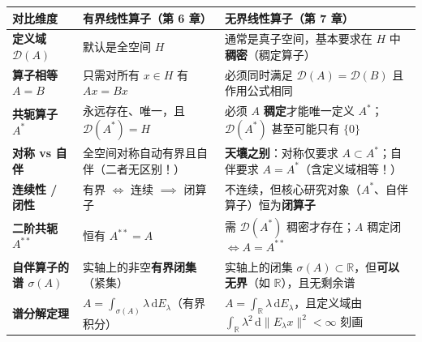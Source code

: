 \documentclass[11pt,a4paper]{article}
\newcounter{none}
\begin{document}
{\def\LTcaptype{none} %
{\small\renewcommand{\arraystretch}{1.38}\setlength{\tabcolsep}{5pt}
\begin{longtable}[]{@{}
  >{\raggedright\arraybackslash}p{}
  >{\raggedright\arraybackslash}p{}
  >{\raggedright\arraybackslash}p{}@{}}
\toprule\noalign{}
\rowcolor{AccentSoft}
\begin{minipage}[b]{\linewidth}\raggedright
对比维度
\end{minipage} & \begin{minipage}[b]{\linewidth}\raggedright
有界线性算子（第 6 章）
\end{minipage} & \begin{minipage}[b]{\linewidth}\raggedright
无界线性算子（第 7 章）
\end{minipage} \\
\midrule\noalign{}
\endhead
\bottomrule\noalign{}
\endlastfoot
\textbf{定义域 \(\mathcal{D}(A)\)} & 默认是全空间 \(H\) & 通常是真子空间，基本要求在 \(H\) 中\textbf{稠密}（稠定算子） \\
\textbf{算子相等 \(A = B\)} & 只需对所有 \(x \in H\) 有 \(Ax = Bx\) & 必须同时满足 \textbf{\(\mathcal{D}(A) = \mathcal{D}(B)\)} 且作用公式相同 \\
\textbf{共轭算子 \(A^*\)} & 永远存在、唯一，且 \(\mathcal{D}(A^*)=H\) & 必须 \(A\) \textbf{稠定}才能唯一定义 \(A^*\)；\(\mathcal{D}(A^*)\) 甚至可能只有 \(\{0\}\) \\
\textbf{对称 vs 自伴} & 全空间对称自动有界且自伴（二者无区别！） & \textbf{天壤之别}：对称仅要求 \(A \subset A^*\)；自伴要求 \(A = A^*\)（含定义域相等！） \\
\textbf{连续性 / 闭性} & 有界 \(\iff\) 连续 \(\implies\) 闭算子 & 不连续，但核心研究对象（\(A^*\)、自伴算子）恒为\textbf{闭算子} \\
\textbf{二阶共轭 \(A^{**}\)} & 恒有 \(A^{**} = A\) & 需 \(\mathcal{D}(A^*)\) 稠密才存在；\(A\) 稠定闭 \(\iff A = A^{**}\) \\
\textbf{自伴算子的谱 \(\sigma(A)\)} & 实轴上的非空\textbf{有界闭集}（紧集） & 实轴上的闭集 \(\sigma(A) \subset \mathbb{R}\)，但\textbf{可以无界}（如 \(\mathbb{R}\)），且无剩余谱 \\
\textbf{谱分解定理} & \(A = \int_{\sigma(A)} \lambda\,\mathrm{d}E_\lambda\)（有界积分） & \(A = \int_{\mathbb{R}} \lambda\,\mathrm{d}E_\lambda\)，且定义域由 \(\int_{\mathbb{R}}\lambda^2\,\mathrm{d}\lVert E_\lambda x\rVert^2 < \infty\) 刻画 \\
\end{longtable}
}
}
\end{document}
